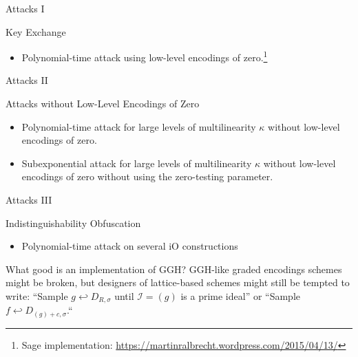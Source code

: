 \documentclass[presentation,smaller]{beamer}
\begin{document}
\begin{frame}[label={sec:orgheadline4}]{Attacks I}
\begin{block}{Key Exchange}
\end{block}

\begin{itemize}
\item Polynomial-time attack using low-level encodings of zero.\footnote{Sage implementation: \url{https://martinralbrecht.wordpress.com/2015/04/13/}}
\end{itemize}
\end{frame}

\begin{frame}[label={sec:orgheadline5}]{Attacks II}
\begin{block}{Attacks without Low-Level Encodings of Zero}

\end{block}

\begin{itemize}
\item Polynomial-time attack for large levels of multilinearity \(κ\) without low-level encodings of zero.
\item Subexponential attack for large levels of multilinearity \(κ\) without low-level encodings of zero without using the zero-testing parameter.
\end{itemize}
\end{frame}

\begin{frame}[label={sec:orgheadline6}]{Attacks III}
\begin{block}{Indistinguishability Obfuscation}
\end{block}

\begin{itemize}
\item Polynomial-time attack on several iO constructions   
\end{itemize}
\end{frame}

\begin{frame}[label={sec:orgheadline7}]{What good is an implementation of GGH?}
GGH-like graded encodings schemes might be broken, but designers of lattice-based schemes might still be tempted to write: “Sample \(g \hookleftarrow D_{R, σ}\) until \({\mathcal{I}}= (g)\) is a prime ideal” or “Sample \(f \hookleftarrow D_{(g)+c, σ}\).“
\end{frame}
\end{document}
